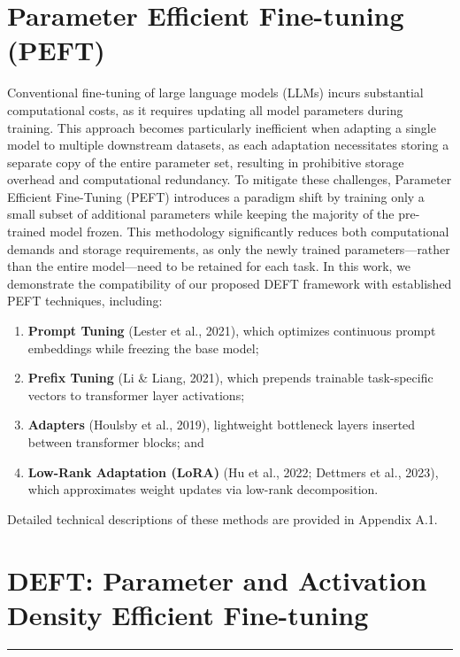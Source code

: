 \documentclass[10pt,twocolumn]{article}
\begin{document}
\section{Parameter Efficient Fine-tuning (PEFT)}

Conventional fine-tuning of large language models (LLMs) incurs substantial computational costs, as it requires updating all model parameters during training. This approach becomes particularly inefficient when adapting a single model to multiple downstream datasets, as each adaptation necessitates storing a separate copy of the entire parameter set, resulting in prohibitive storage overhead and computational redundancy. To mitigate these challenges, Parameter Efficient Fine-Tuning (PEFT) introduces a paradigm shift by training only a small subset of additional parameters while keeping the majority of the pre-trained model frozen. This methodology significantly reduces both computational demands and storage requirements, as only the newly trained parameters—rather than the entire model—need to be retained for each task. In this work, we demonstrate the compatibility of our proposed DEFT framework with established PEFT techniques, including:
\begin{enumerate}
  \item \textbf{Prompt Tuning} (Lester et al., 2021), which optimizes continuous prompt embeddings while freezing the base model;
  \item \textbf{Prefix Tuning} (Li \& Liang, 2021), which prepends trainable task-specific vectors to transformer layer activations;
  \item \textbf{Adapters} (Houlsby et al., 2019), lightweight bottleneck layers inserted between transformer blocks; and
  \item \textbf{Low-Rank Adaptation (LoRA)} (Hu et al., 2022; Dettmers et al., 2023), which approximates weight updates via low-rank decomposition.
\end{enumerate}
Detailed technical descriptions of these methods are provided in Appendix A.1.




\section{DEFT: Parameter and Activation Density Efficient Fine-tuning}

\vspace{1em} \hrule \vspace{1em}
\end{document}
